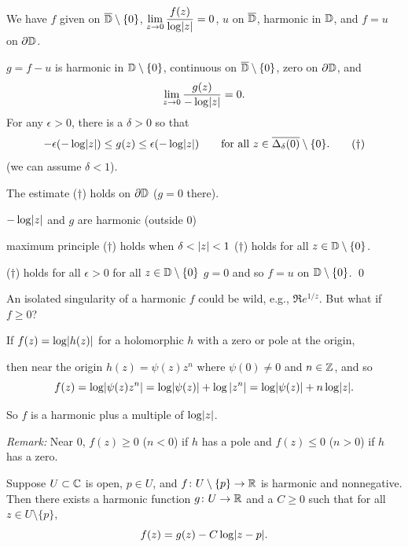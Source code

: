 \documentclass[10pt,aspectratio=169]{beamer}
\begin{document}
\begin{frame}
We have
$f$ given on $\overline{{\mathbb{D}}} \setminus \{ 0 \}$,
$\displaystyle \lim_{z\to 0} \frac{f(z)}{\log \lvert {z} \rvert} = 0$,
$u$ on $\overline{{\mathbb{D}}}$, harmonic in ${\mathbb{D}}$, and $f = u$ on $\partial {\mathbb{D}}$.

\medskip
\pause

$g = f-u$ is harmonic in ${\mathbb{D}} \setminus \{ 0 \}$, continuous
on $\overline{{\mathbb{D}}} \setminus \{ 0 \}$, zero on $\partial {\mathbb{D}}$, and
\[
\lim_{z \to 0} \frac{g(z)}{-\log \lvert {z} \rvert} = 0.
\]
\pause
For any $\epsilon > 0$, there is a $\delta > 0$ so that
\[
-\epsilon (- \log\lvert {z} \rvert)
\leq
g(z)
\leq
\epsilon (- \log\lvert {z} \rvert)
\qquad
\text{for all }
z \in \overline{\Delta_\delta(0)} \setminus \{ 0 \}.
\tag{$\dagger$}
\]
(we can assume $\delta < 1$).

\medskip
\pause

The estimate ($\dagger$) holds on $\partial {\mathbb{D}}$ ($g=0$ there).

\pause
\medskip

$-\log\lvert {z} \rvert$ and $g$ are harmonic (outside $0$) \wthus

maximum principle
\wthus
($\dagger$) holds when
$\delta < \lvert {z} \rvert < 1$ \wthus ($\dagger$) holds
for all $z \in {\mathbb{D}} \setminus \{ 0 \}$.

\medskip
\pause

($\dagger$) holds for all $\epsilon > 0$ for all $z \in {\mathbb{D}} \setminus \{0\}$
\wthus 
$g = 0$ and so $f=u$ on ${\mathbb{D}} \setminus \{ 0 \}$.
\qed
\end{frame}

\begin{frame}

An isolated singularity of a harmonic $f$ could be wild, e.g., $\Re
e^{1/z}$.  But what if $f \geq 0$?

\medskip
\pause

If $f(z) = \log \lvert {h(z)} \rvert$ for a holomorphic $h$
with a zero or pole at the origin,

then near the origin $h(z) = \psi(z) z^n$ where $\psi(0)\not=0$ and $n \in {\mathbb{Z}}$,
and so
\[
f(z) = 
\log \lvert {\psi(z) z^n} \rvert = 
\log \lvert {\psi(z)} \rvert + \log \left\lvert {z^n} \right\rvert = 
\log \lvert {\psi(z)} \rvert +
n \log \lvert {z} \rvert .
\]

So $f$ is a harmonic plus a multiple of $\log \lvert {z} \rvert$.

\medskip
\pause

\textit{Remark:}
Near $0$,
$f(z) \geq 0$ ($n < 0$) if $h$ has a pole
and
$f(z) \leq 0$ ($n > 0$) if $h$ has a zero.

\pause

\begin{theorem}[B\^{o}cher]
Suppose $U \subset {\mathbb{C}}$ is open, $p \in U$, and
$f \colon U \setminus \{ p \} \to {\mathbb{R}}$ is
harmonic and nonnegative.  Then there exists a harmonic function
$g \colon U \to {\mathbb{R}}$ and a $C \geq 0$ such that
for all $z \in U \setminus \{ p \}$,
\begin{equation*}
f(z) = g(z) - C \log \lvert {z-p} \rvert .
\end{equation*}
\end{theorem}

\end{frame}
\end{document}
